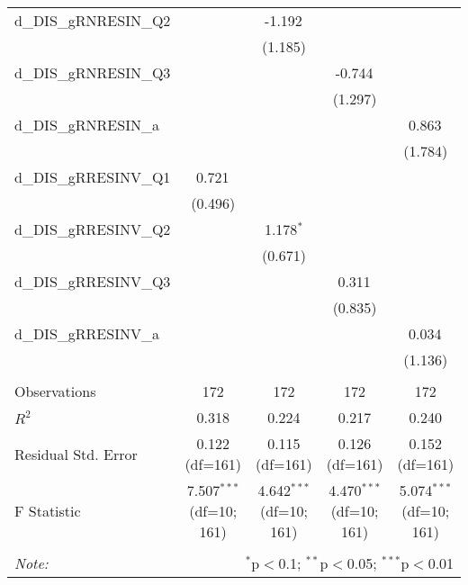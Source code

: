 \begin{table}[!htbp]
\begin{tabular}{@{\extracolsep{5pt}}lcccc}
 d_DIS_gRNRESIN_Q2 & & -1.192$^{}$ & & \\
& & (1.185) & & \\
 d_DIS_gRNRESIN_Q3 & & & -0.744$^{}$ & \\
& & & (1.297) & \\
 d_DIS_gRNRESIN_a & & & & 0.863$^{}$ \\
& & & & (1.784) \\
 d_DIS_gRRESINV_Q1 & 0.721$^{}$ & & & \\
& (0.496) & & & \\
 d_DIS_gRRESINV_Q2 & & 1.178$^{*}$ & & \\
& & (0.671) & & \\
 d_DIS_gRRESINV_Q3 & & & 0.311$^{}$ & \\
& & & (0.835) & \\
 d_DIS_gRRESINV_a & & & & 0.034$^{}$ \\
& & & & (1.136) \\
\hline \\[-1.8ex]
 Observations & 172 & 172 & 172 & 172 \\
 $R^2$ & 0.318 & 0.224 & 0.217 & 0.240 \\
 Residual Std. Error & 0.122 (df=161) & 0.115 (df=161) & 0.126 (df=161) & 0.152 (df=161) \\
 F Statistic & 7.507$^{***}$ (df=10; 161) & 4.642$^{***}$ (df=10; 161) & 4.470$^{***}$ (df=10; 161) & 5.074$^{***}$ (df=10; 161) \\
\hline
\hline \\[-1.8ex]
\textit{Note:} & \multicolumn{4}{r}{$^{*}$p$<$0.1; $^{**}$p$<$0.05; $^{***}$p$<$0.01} \\
\end{tabular}
\end{table}